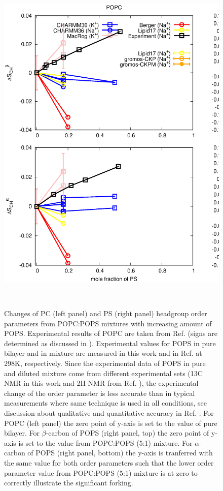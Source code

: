 \documentclass[aps,prl,superscriptaddress,twocolumn]{revtex4}
\begin{document}
\begin{figure}[]
  \centering
  \includegraphics[width=16.0cm]{../Figs/HGorderparametersPCvsPS.eps}
  \caption{\label{HGorderparametersPCvsPS}
    Changes of PC (left panel) and PS (right panel) headgroup order parameters
    from POPC:POPS mixtures with increasing amount of POPS.
    Experimental results of POPC are taken from Ref. 
    (signs are determined as discussed in \cite{botan15,ollila16}).
    Experimental values for POPS in pure bilayer and in mixture are  
    measured in this work and in Ref.  at 298K, respectively.
    Since the experimental data of POPS in pure and diluted mixture come from
    different experimental sets (13C NMR in this work and 2H NMR from Ref. ),
    the experimental change of the order parameter is less accurate than in typical measurements
    where same technique is used in all conditions, see discussion about qualitative and quantitative 
    accuracy in Ref. .
    For POPC (left panel) the zero point of y-axis is set to the value of pure bilayer.
    For $\beta$-carbon of POPS (right panel, top) the zero point of y-axis is
    set to the value from POPC:POPS (5:1) mixture.
    For $\alpha$-carbon of POPS (right panel, bottom) the y-axis is tranferred
    with the same value for both order parameters such that the lower order
    parameter value from POPC:POPS (5:1) mixture is at zero
    to correctly illustrate the significant forking.
  }
   \\
\end{figure}
\end{document}
